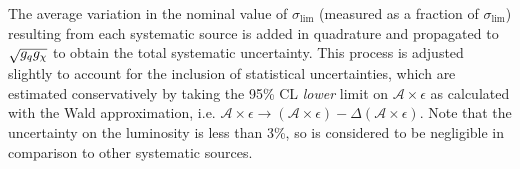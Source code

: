 The average variation in the nominal value of $\sigma_{\mathrm{lim}}$ (measured as a fraction of $\sigma_{\mathrm{lim}}$) resulting from each systematic source is added in quadrature and propagated to $\sqrt{g_q g_{\chi}}$ to obtain the total systematic uncertainty. This process is adjusted slightly to account for the inclusion of statistical uncertainties, which are estimated conservatively by taking the 95\% CL \emph{lower} limit on $\mathcal{A} \times \epsilon$ as calculated with the Wald approximation, i.e. $\mathcal{A}\times\epsilon \rightarrow (\mathcal{A}\times\epsilon) - \Delta(\mathcal{A}\times\epsilon)$. Note that the uncertainty on the luminosity is less than 3\%, so is considered to be negligible in comparison to other systematic sources.
